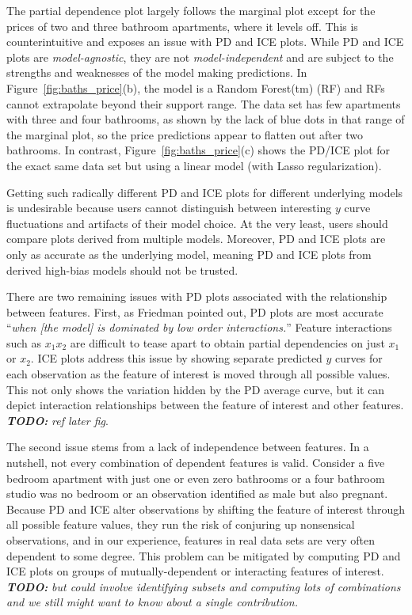 \documentclass[12pt]{article}
\newcommand{\figref}[1]{Figure~\ref{#1}}
\newcommand{\todo}[1]{{\bf\em TODO:} {\em #1}}
\begin{document}
The partial dependence plot largely follows the marginal plot except for the prices of two and three bathroom apartments, where it levels off. This is counterintuitive and exposes an issue with PD and ICE plots. While PD and ICE plots are {\em model-agnostic}, they are not {\em model-independent} and are subject to the strengths and weaknesses of the model making predictions. In \figref{fig:baths_price}(b), the model is a Random Forest(tm) (RF) and RFs cannot extrapolate beyond their support range.  The data set has few apartments with three and four bathrooms, as shown by the lack of blue dots in that range of the marginal plot, so the price predictions appear to flatten out after two bathrooms.  In contrast, \figref{fig:baths_price}(c) shows the PD/ICE plot for the exact same data set but using a linear model (with Lasso regularization).

Getting such radically different PD and ICE plots for different underlying models is undesirable because users cannot distinguish between interesting $y$ curve fluctuations and artifacts of their model choice. At the very least, users should compare plots derived from multiple models. Moreover, PD and ICE plots are only as accurate as the underlying model, meaning PD and ICE plots from derived high-bias models should not be trusted.

There are two remaining issues with PD plots associated with the relationship between features. First, as Friedman pointed out, PD plots are most accurate ``{\em when {\em [the model]} is dominated by low order interactions.}''  Feature interactions such as $x_1x_2$ are difficult to tease apart to obtain partial dependencies on just $x_1$ or $x_2$. ICE plots address this issue by showing separate predicted $y$ curves for each observation as the feature of interest is moved through all possible values.  This not only shows the variation hidden by the PD average curve, but it can depict interaction relationships between the feature of interest and other features. \todo{ref later fig}.

The second issue stems from a lack of independence between features.  In a nutshell, not every combination of dependent features is valid. Consider a five bedroom apartment with just one or even zero bathrooms or a four bathroom studio was no bedroom or an observation identified as male but also pregnant.  Because PD and ICE alter observations by shifting the feature of interest through all possible feature values, they run the risk of conjuring up nonsensical observations, and in our experience, features in real data sets are very often dependent to some degree. This problem can be mitigated by computing PD and ICE plots on groups of mutually-dependent or interacting features of interest. \todo{but could involve identifying subsets and computing lots of combinations and we still might want to know about a single contribution.}
\end{document}
